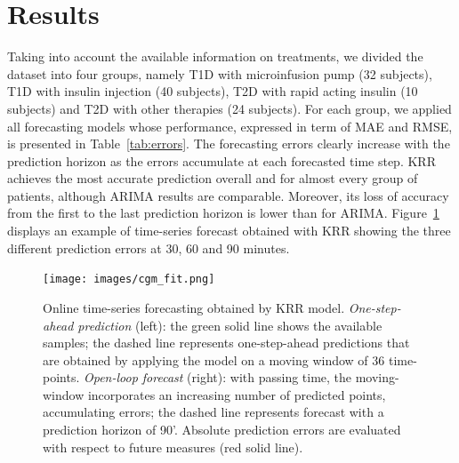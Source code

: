 \section{Results}
Taking into account the available information on treatments, we divided the dataset into four groups, namely T1D with microinfusion pump (32 subjects), T1D with insulin injection (40 subjects), T2D with rapid acting insulin (10 subjects) and T2D with other therapies (24 subjects). For each group, we applied all forecasting models whose performance,
expressed in term of MAE and RMSE, is presented in Table~\ref{tab:errors}. 
The forecasting errors clearly increase with the prediction horizon as the errors accumulate at each forecasted time step. KRR achieves the most accurate prediction overall and for almost every group of patients, although ARIMA results are comparable. Moreover, its loss of accuracy from the first to the last prediction horizon is lower than for ARIMA.
Figure~\ref{fig:fit} displays an example of time-series forecast obtained with KRR showing the three different prediction errors at 30, 60 and 90 minutes.


\begin{figure}[tb]
	\caption{Online time-series forecasting obtained by KRR model. {\em One-step-ahead prediction} (left): the green solid line shows the available samples; the dashed line represents one-step-ahead predictions that are obtained by applying the model on a moving window of 36 time-points. {\em Open-loop forecast} (right): with passing time, the moving-window incorporates an increasing number of predicted points, accumulating errors; the dashed line represents forecast with a prediction horizon of 90'.
		Absolute prediction errors are evaluated with respect to future measures (red solid line).
	}\label{fig:fit}
	\centering
	\texttt{[image: images/cgm\_fit.png]}
\end{figure}


